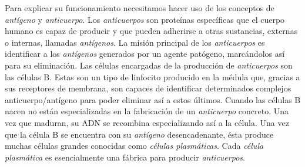 
Para explicar su funcionamiento necesitamos hacer uso de los conceptos de \textit{antígeno} y \textit{anticuerpo}. Los \textit{anticuerpos} son proteínas específicas que el cuerpo humano es capaz de producir y que pueden adherirse a otras sustancias, externas o internas, llamadas \textit{antígenos}. La misión principal de los \textit{anticuerpos} es identificar a los \textit{antígenos} generados por un agente patógeno, marcándolos así para su eliminación. Las células encargadas de la producción de \textit{anticuerpos} son las células B. Estas son un tipo de linfocito producido en la médula que, gracias a sus receptores de membrana, son capaces de identificar determinados complejos anticuerpo/antígeno para poder eliminar así a estos últimos. Cuando las células B nacen no están especializadas en la fabricación de un \textit{anticuerpo} concreto. Una vez que maduran, su ADN se recombina especializando así a la célula. Una vez que la célula B se encuentra con su \textit{antígeno} desencadenante, ésta produce muchas células grandes conocidas como \textit{células plasmáticas}. Cada \textit{célula plasmática} es esencialmente una fábrica para producir \textit{anticuerpos}. 

